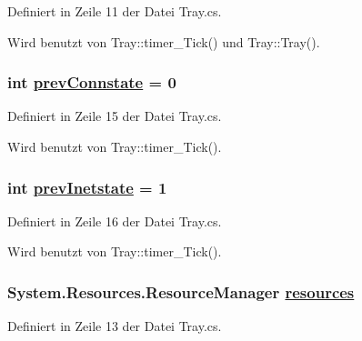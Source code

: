 Definiert in Zeile 11 der Datei Tray.cs.

Wird benutzt von Tray::timer\_\-Tick() und Tray::Tray().\hypertarget{classQbeTray_1_1Tray_QbeTray_1_1Trayr3}{
\subsubsection[prevConnstate]{\setlength{\rightskip}{0pt plus 5cm}int \hyperlink{classQbeTray_1_1Tray_QbeTray_1_1Trayr3}{prev\-Connstate} = 0}}
\label{classQbeTray_1_1Tray_QbeTray_1_1Trayr3}




Definiert in Zeile 15 der Datei Tray.cs.

Wird benutzt von Tray::timer\_\-Tick().\hypertarget{classQbeTray_1_1Tray_QbeTray_1_1Trayr4}{
\subsubsection[prevInetstate]{\setlength{\rightskip}{0pt plus 5cm}int \hyperlink{classQbeTray_1_1Tray_QbeTray_1_1Trayr4}{prev\-Inetstate} = 1}}
\label{classQbeTray_1_1Tray_QbeTray_1_1Trayr4}




Definiert in Zeile 16 der Datei Tray.cs.

Wird benutzt von Tray::timer\_\-Tick().\hypertarget{classQbeTray_1_1Tray_QbeTray_1_1Trayr2}{
\subsubsection[resources]{\setlength{\rightskip}{0pt plus 5cm}System.Resources.Resource\-Manager \hyperlink{classQbeTray_1_1Tray_QbeTray_1_1Trayr2}{resources}}}
\label{classQbeTray_1_1Tray_QbeTray_1_1Trayr2}




Definiert in Zeile 13 der Datei Tray.cs.

